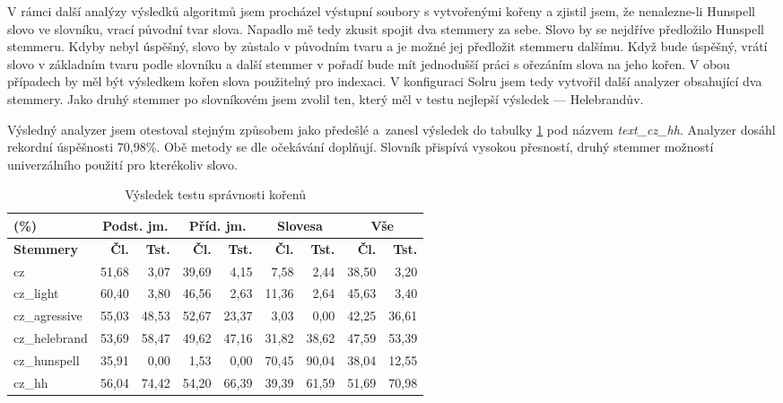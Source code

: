 V rámci další analýzy výsledků algoritmů jsem procházel výstupní soubory s vytvořenými kořeny a zjistil jsem, že nenalezne-li Hunspell slovo ve slovníku, vrací původní tvar slova. Napadlo mě tedy zkusit spojit dva stemmery za sebe. Slovo by se nejdříve předložilo Hunspell stemmeru. Kdyby nebyl úspěšný, slovo by zůstalo v původním tvaru a je možné jej předložit stemmeru dalšímu. Když bude úspěšný, vrátí slovo v základním tvaru podle slovníku a další stemmer v pořadí bude mít jednodušší práci s ořezáním slova na jeho kořen. V obou případech by měl být výsledkem kořen slova použitelný pro indexaci. V konfiguraci Solru jsem tedy vytvořil další analyzer obsahující dva stemmery. Jako druhý stemmer po slovníkovém jsem zvolil ten, který měl v testu nejlepší výsledek --- Helebrandův.

Výsledný analyzer jsem otestoval stejným způsobem jako předešlé a~zanesl výsledek do tabulky \ref{tab:test_stm} pod názvem \emph{text\_cz\_hh}. Analyzer dosáhl rekordní úspěšnosti 70,98\%. Obě metody se dle očekávání doplňují. Slovník přispívá vysokou přesností, druhý stemmer možností univerzálního použití pro kterékoliv slovo.

\begin{table}
\begin{center}
\begin{tabular}{|l|r|r|r|r|r|r|r|r|}
\hline
(\%) & \multicolumn{2}{|c|}{\textbf{Podst. jm.}} & \multicolumn{2}{|c|}{\textbf{Příd. jm.}} & \multicolumn{2}{|c|}{\textbf{Slovesa}} & \multicolumn{2}{|c|}{\textbf{Vše}} \\ \hline
\textbf{Stemmery} & \textbf{Čl.} & \textbf{Tst.} & \textbf{Čl.} & \textbf{Tst.} & \textbf{Čl.} & \textbf{Tst.} & \textbf{Čl.} & \textbf{Tst.} \\ \hline
cz & 51,68 & 3,07 & 39,69 & 4,15 & 7,58 & 2,44 & 38,50 & 3,20 \\ \hline
cz\_light & 60,40 & 3,80 & 46,56 & 2,63 & 11,36 & 2,64 & 45,63 & 3,40 \\ \hline
cz\_agressive & 55,03 & 48,53 & 52,67 & 23,37 & 3,03 & 0,00 & 42,25 & 36,61 \\ \hline
cz\_helebrand & 53,69 & 58,47 & 49,62 & 47,16 & 31,82 & 38,62 & 47,59 & 53,39 \\ \hline
cz\_hunspell & 35,91 & 0,00 & 1,53 & 0,00 & 70,45 & 90,04 & 38,04 & 12,55 \\ \hline
\hline
cz\_hh & 56,04 & 74,42 & 54,20 & 66,39 & 39,39 & 61,59 & 51,69 & 70,98 \\ \hline
\end{tabular}
\end{center}
\caption{Výsledek testu správnosti kořenů}
\label{tab:test_stm}
\end{table}

